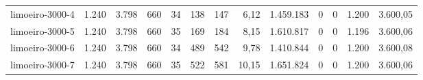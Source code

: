 \begin{table}[ht!]
{\begin{tabular}{lrrrrrrrrrrrr}
			\rowcolor{rowlight}limoeiro-3000-4                                                        & 1.240 & 3.798 & 660 & 34 & 138 & 147 & 6,12  & 1.459.183 & 0 & 0 & 1.200 & 3.600,05 \\
			\rowcolor{rowlight}limoeiro-3000-5                                                        & 1.240 & 3.798 & 660 & 35 & 169 & 184 & 8,15  & 1.610.817 & 0 & 0 & 1.196 & 3.600,06 \\
			\rowcolor{rowlight}limoeiro-3000-6                                                        & 1.240 & 3.798 & 660 & 34 & 489 & 542 & 9,78  & 1.410.844 & 0 & 0 & 1.200 & 3.600,08 \\
			\rowcolor{rowlight}limoeiro-3000-7                                                        & 1.240 & 3.798 & 660 & 35 & 522 & 581 & 10,15 & 1.651.824 & 0 & 0 & 1.200 & 3.600,06 \\
			\bottomrule
		\end{tabular}%
	}
\end{table}

